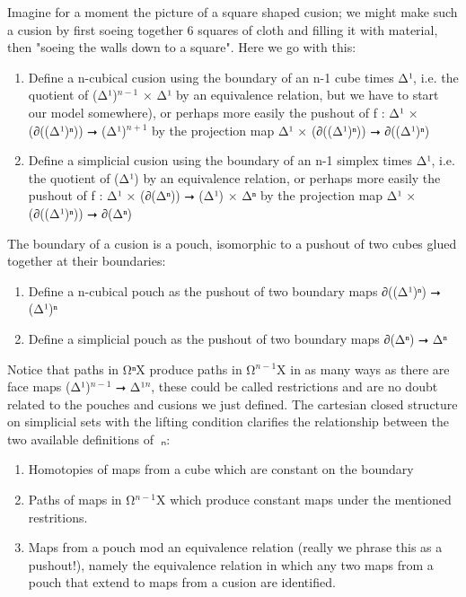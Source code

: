 \documentclass{book}
\theoremstyle{definition}
\begin{document}
Imagine for a moment the picture of a square shaped cusion; we might make such a cusion by first soeing together 6 squares of cloth and filling it with material, then "soeing the walls down to a square". Here we go with this:

\begin{enumerate}
\item Define a n-cubical cusion using the boundary of an n-1 cube times Δ¹, i.e. the quotient of (Δ¹)${}^{n-1}$ × Δ¹ by an equivalence relation, but we have to start our model somewhere), or perhaps more easily the pushout of f : Δ¹ × (∂((Δ¹)ⁿ)) ⭢ (Δ¹)${}^{n+1}$ by the projection map Δ¹ × (∂((Δ¹)ⁿ)) ⭢ ∂((Δ¹)ⁿ)
\item Define a simplicial cusion using the boundary of an n-1 simplex times Δ¹, i.e. the quotient of (Δ¹) by an equivalence relation, or perhaps more easily the pushout of f : Δ¹ × (∂(Δⁿ)) ⭢ (Δ¹) × Δⁿ by the projection map Δ¹ × (∂((Δ¹)ⁿ)) ⭢ ∂(Δⁿ)
\end{enumerate}

The boundary of a cusion is a pouch, isomorphic to a pushout of two cubes glued together at their boundaries:

\begin{enumerate}
\item Define a n-cubical pouch as the pushout of two boundary maps ∂((Δ¹)ⁿ) ⭢ (Δ¹)ⁿ
\item Define a simplicial pouch as the pushout of two boundary maps ∂(Δⁿ) ⭢ Δⁿ
\end{enumerate}

Notice that paths in Ω⃗ⁿX produce paths in Ω⃗${}^{n-1}$X in as many ways as there are face maps (Δ¹)${}^{n-1}$ ⭢ Δ¹${}^{n}$, these could be called restrictions and are no doubt related to the pouches and cusions we just defined. The cartesian closed structure on simplicial sets with the lifting condition clarifies the relationship between the two available definitions of π⃗ₙ:

\begin{enumerate}
\item Homotopies of maps from a cube which are constant on the boundary
\item Paths of maps in Ω⃗${}^{n-1}$X which produce constant maps under the mentioned restritions.
\item Maps from a pouch mod an equivalence relation (really we phrase this as a pushout!), namely the equivalence relation in which any two maps from a pouch that extend to maps from a cusion are identified.
\end{enumerate}
\end{document}
